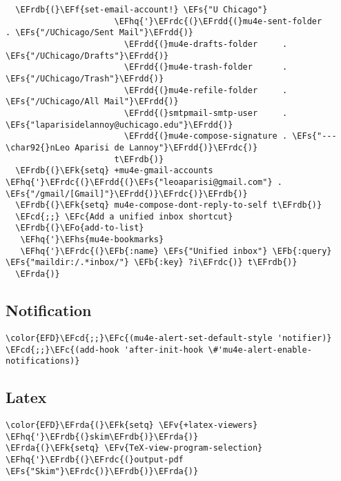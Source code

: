 \documentclass[12pt]{article}
\theoremstyle{plain}%
\theoremstyle{definition}
\theoremstyle{remark}
\newcommand{\EFc}[1]{\textcolor{EFc}{#1}} %
\newcommand{\EFcd}[1]{\textcolor{EFcd}{#1}} %
\newcommand{\EFs}[1]{\textcolor{EFs}{#1}} %
\newcommand{\EFk}[1]{\textcolor{EFk}{#1}} %
\newcommand{\EFb}[1]{\textcolor{EFb}{#1}} %
\newcommand{\EFf}[1]{\textcolor{EFf}{#1}} %
\newcommand{\EFv}[1]{\textcolor{EFv}{#1}} %
\newcommand{\EFo}[1]{\textcolor{EFo}{#1}} %
\newcommand{\EFhq}[1]{\textcolor{EFhq}{#1}} %
\newcommand{\EFhs}[1]{\textcolor{EFhs}{#1}} %
\newcommand{\EFrda}[1]{\textcolor{EFrda}{#1}} %
\newcommand{\EFrdb}[1]{\textcolor{EFrdb}{#1}} %
\newcommand{\EFrdc}[1]{\textcolor{EFrdc}{#1}} %
\newcommand{\EFrdd}[1]{\textcolor{EFrdd}{#1}} %
\begin{document}
\begin{Code}
\begin{Verbatim}
  \EFrdb{(}\EFf{set-email-account!} \EFs{"U Chicago"}
                      \EFhq{'}\EFrdc{(}\EFrdd{(}mu4e-sent-folder       . \EFs{"/UChicago/Sent Mail"}\EFrdd{)}
                        \EFrdd{(}mu4e-drafts-folder     . \EFs{"/UChicago/Drafts"}\EFrdd{)}
                        \EFrdd{(}mu4e-trash-folder      . \EFs{"/UChicago/Trash"}\EFrdd{)}
                        \EFrdd{(}mu4e-refile-folder     . \EFs{"/UChicago/All Mail"}\EFrdd{)}
                        \EFrdd{(}smtpmail-smtp-user     . \EFs{"laparisidelannoy@uchicago.edu"}\EFrdd{)}
                        \EFrdd{(}mu4e-compose-signature . \EFs{"---\char92{}nLeo Aparisi de Lannoy"}\EFrdd{)}\EFrdc{)}
                      t\EFrdb{)}
  \EFrdb{(}\EFk{setq} +mu4e-gmail-accounts \EFhq{'}\EFrdc{(}\EFrdd{(}\EFs{"leoaparisi@gmail.com"} . \EFs{"/gmail/[Gmail]"}\EFrdd{)}\EFrdc{)}\EFrdb{)}
  \EFrdb{(}\EFk{setq} mu4e-compose-dont-reply-to-self t\EFrdb{)}
  \EFcd{;;} \EFc{Add a unified inbox shortcut}
  \EFrdb{(}\EFo{add-to-list}
   \EFhq{'}\EFhs{mu4e-bookmarks}
   \EFhq{'}\EFrdc{(}\EFb{:name} \EFs{"Unified inbox"} \EFb{:query} \EFs{"maildir:/.*inbox/"} \EFb{:key} ?i\EFrdc{)} t\EFrdb{)}
  \EFrda{)}
\end{Verbatim}
\end{Code}
\subsection{Notification}
\label{sec:org5b85dd4}
\begin{Code}
\begin{Verbatim}
\color{EFD}\EFcd{;;}\EFc{(mu4e-alert-set-default-style 'notifier)}
\EFcd{;;}\EFc{(add-hook 'after-init-hook \#'mu4e-alert-enable-notifications)}
\end{Verbatim}
\end{Code}
\subsection{Latex}
\label{sec:org7cf2c92}
\begin{Code}
\begin{Verbatim}
\color{EFD}\EFrda{(}\EFk{setq} \EFv{+latex-viewers} \EFhq{'}\EFrdb{(}skim\EFrdb{)}\EFrda{)}
\EFrda{(}\EFk{setq} \EFv{TeX-view-program-selection} \EFhq{'}\EFrdb{(}\EFrdc{(}output-pdf \EFs{"Skim"}\EFrdc{)}\EFrdb{)}\EFrda{)}
\end{Verbatim}
\end{Code}
\end{document}
